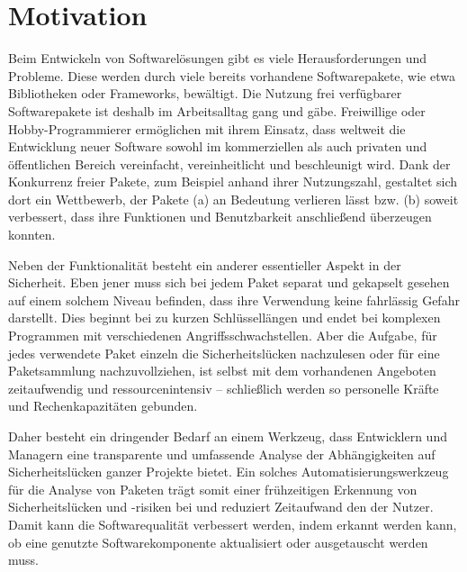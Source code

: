 \section{Motivation} \label{subsec:Motivation}
    Beim Entwickeln von Softwarelösungen gibt es viele Herausforderungen und Probleme. 
    Diese werden durch viele bereits vorhandene Softwarepakete, wie etwa Bibliotheken oder Frameworks, bewältigt.
    Die Nutzung frei verfügbarer Softwarepakete ist deshalb im Arbeitsalltag gang und gäbe.
    Freiwillige oder Hobby-Programmierer ermöglichen mit ihrem Einsatz, dass weltweit die Entwicklung neuer Software sowohl im kommerziellen als auch privaten und öffentlichen Bereich vereinfacht, vereinheitlicht und beschleunigt wird.
    Dank der Konkurrenz freier Pakete, zum Beispiel anhand ihrer Nutzungszahl, gestaltet sich dort ein Wettbewerb, der Pakete (a) an Bedeutung verlieren lässt bzw. (b) soweit verbessert, dass ihre Funktionen und Benutzbarkeit anschließend überzeugen konnten.

    Neben der Funktionalität besteht ein anderer essentieller Aspekt in der Sicherheit.
    Eben jener muss sich bei jedem Paket separat und gekapselt gesehen auf einem solchem Niveau befinden, dass ihre Verwendung keine fahrlässig Gefahr darstellt.
    Dies beginnt bei zu kurzen Schlüssellängen und endet bei komplexen Programmen mit verschiedenen Angriffsschwachstellen.
    Aber die Aufgabe, für jedes verwendete Paket einzeln die Sicherheitslücken nachzulesen oder für eine Paketsammlung nachzuvollziehen, ist selbst mit dem vorhandenen Angeboten zeitaufwendig und ressourcenintensiv -- schließlich werden so personelle Kräfte und Rechenkapazitäten gebunden.

    Daher besteht ein dringender Bedarf an einem Werkzeug, dass Entwicklern und Managern eine transparente und umfassende Analyse der Abhängigkeiten auf Sicherheitslücken ganzer Projekte bietet.
    Ein solches Automatisierungswerkzeug für die Analyse von Paketen trägt somit einer frühzeitigen Erkennung von Sicherheitslücken und -risiken bei und reduziert Zeitaufwand den der Nutzer.
    Damit kann die Softwarequalität verbessert werden, indem erkannt werden kann, ob eine genutzte Softwarekomponente aktualisiert oder ausgetauscht werden muss.

